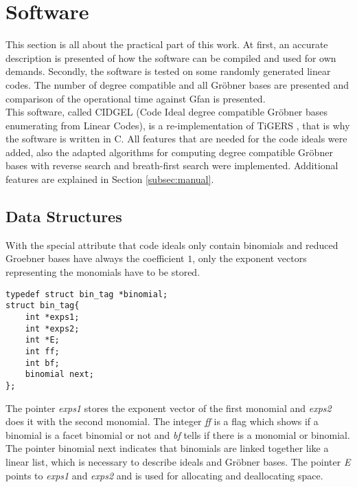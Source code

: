 \section{Software}
\label{sec:software}
This section is all about the practical part of this work. At first, an accurate description is presented of how the software can be compiled and used for own demands.
Secondly, the software is tested on some randomly generated linear codes. The number of degree compatible and all Gröbner bases are presented and comparison of the operational time against Gfan \cite{gfan} is presented. \\
This software, called CIDGEL (Code Ideal degree compatible Gröbner bases enumerating from Linear Codes), is a re-implementation of TiGERS \cite{tigers}, that is why the software is written in C. All features that are needed for the code ideals were added, also the adapted algorithms for computing degree compatible Gröbner bases with reverse search and breath-first search were implemented.   
Additional features are explained in Section \ref{subsec:manual}.


\subsection{Data Structures}
\label{subsec:datastructure}
With the special attribute that code ideals only contain binomials and reduced Groebner bases have always the coefficient $1$, only the exponent vectors representing the monomials have to be stored.


\begin{lstlisting} 
typedef struct bin_tag *binomial;
struct bin_tag{
    int *exps1;
    int *exps2;
    int *E;
    int ff;
    int bf;
    binomial next;
};

\end{lstlisting}
\newpage
The pointer \emph{exps1} stores the exponent vector of the first monomial and \emph{exps2} does it with the second monomial.
The integer \emph{ff} is a flag which shows if a binomial is a facet binomial or not and \emph{bf} tells if there is a monomial or binomial.
The pointer binomial next indicates that binomials are linked together like a linear list, which is necessary to describe ideals and Gröbner bases. The pointer \emph{E} points to \emph{exps1} and \emph{exps2} and is used for allocating and deallocating space. \\

